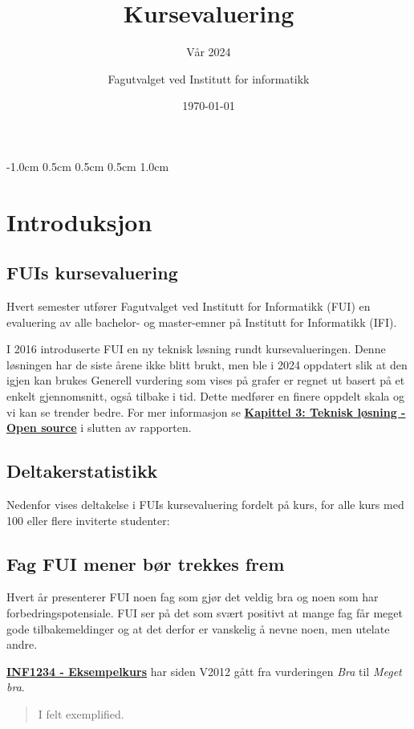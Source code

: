\documentclass[norsk,a4paper,11pt]{report}
\author{Fagutvalget ved Institutt for informatikk}
\title{Kursevaluering}
\subtitle{Vår 2024}
\date{\today}
\begin{document}
\ififorside{}

\setlength{\topmargin}      {-1.0cm}
\setlength{\headsep}        {0.5cm}
\setlength{\oddsidemargin}  {0.5cm}
\setlength{\evensidemargin} {0.5cm}
\setlength{\footskip}       {1.0cm}
\renewcommand{\thesection}{}
\renewcommand{\thesubsection}{}
\tableofcontents
\newpage
\chapter{Introduksjon}
\label{chp:intro}
\section{FUIs kursevaluering}
Hvert semester utfører Fagutvalget ved Institutt for Informatikk (FUI) en evaluering av alle bachelor- og master-emner på Institutt for Informatikk (IFI).

I 2016 introduserte FUI en ny teknisk løsning rundt kursevalueringen. Denne løsningen har de siste årene ikke blitt brukt, men ble i 2024 oppdatert slik at den igjen kan brukes
Generell vurdering som vises på grafer er regnet ut basert på et enkelt gjennomsnitt, også tilbake i tid.
Dette medfører en finere oppdelt skala og vi kan se trender bedre.
For mer informasjon se \textbf{\hyperref[sec:OS]{Kapittel 3: Teknisk løsning - Open source}} i slutten av rapporten.

\section{Deltakerstatistikk}
Nedenfor vises deltakelse i FUIs kursevaluering fordelt på kurs, for alle kurs med 100 eller flere inviterte studenter:


\section{Fag FUI mener bør trekkes frem}
Hvert år presenterer FUI noen fag som gjør det veldig bra og noen som har forbedringspotensiale.
FUI ser på det som svært positivt at mange fag får meget gode tilbakemeldinger og at det derfor er vanskelig å nevne noen, men utelate andre.

\hyperref[course:INF1234]{\textbf{INF1234 - Eksempelkurs}} har siden V2012 gått fra vurderingen  \emph{Bra} til \emph{Meget bra}.

\begin{quote}
I felt exemplified.
\end{quote}
\end{document}
